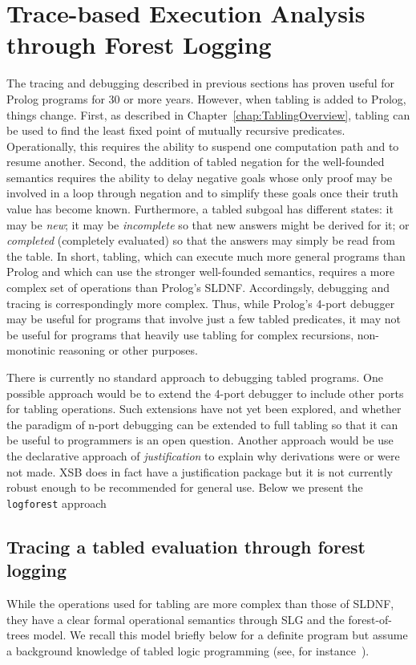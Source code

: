 \newcommand{\ctrace}{{\tt logforest}}

\section{Trace-based Execution Analysis through Forest Logging} \label{sec:forest-trace}
%
The tracing and debugging described in previous sections has proven
useful for Prolog programs for 30 or more years.  However, when
tabling is added to Prolog, things change.  First, as described in
Chapter~\ref{chap:TablingOverview}, tabling can be used to find the
least fixed point of mutually recursive predicates.  Operationally,
this requires the ability to suspend one computation path and to
resume another.  Second, the addition of tabled negation for the
well-founded semantics requires the ability to delay negative goals
whose only proof may be involved in a loop through negation and to
simplify these goals once their truth value has become
known. Furthermore, a tabled subgoal has different states: it may be
{\em new}; it may be {\em incomplete} so that new answers might be
derived for it; or {\em completed} (completely evaluated) so that the
answers may simply be read from the table.  In short, tabling, which
can execute much more general programs than Prolog and which can use
the stronger well-founded semantics, requires a more complex set of
operations than Prolog's SLDNF.  Accordingsly, debugging and tracing
is correspondingly more complex.  Thus, while Prolog's 4-port debugger
may be useful for programs that involve just a few tabled predicates,
it may not be useful for programs that heavily use tabling for complex
recursions, non-monotinic reasoning or other purposes.

There is currently no standard approach to debugging tabled programs.
One possible approach would be to extend the 4-port debugger to
include other ports for tabling operations.  Such extensions have not
yet been explored, and whether the paradigm of n-port debugging can be
extended to full tabling so that it can be useful to programmers is an
open question.  Another approach would be use the declarative approach
of {\em justification} \cite{GuRR01,PGDRR04} to explain why
derivations were or were not made.  XSB does in fact have a
justification package but it is not currently robust enough to be
recommended for general use.  Below we present the {\tt \ctrace}
approach~\cite{Swif14b}

\subsection{Tracing a tabled evaluation through forest logging}
%
While the operations used for tabling are more complex than those of
SLDNF, they have a clear formal operational semantics through SLG and
the forest-of-trees model.  We recall this model briefly below for a
definite program but assume a background knowledge of tabled logic
programming (see, for instance~\cite{SwiW12}).

